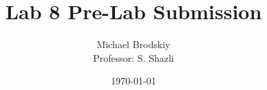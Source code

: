


\title{Lab 8 Pre-Lab Submission}
\date{\today}
\author{Michael Brodskiy\\ \small Professor: S. Shazli}



\maketitle

